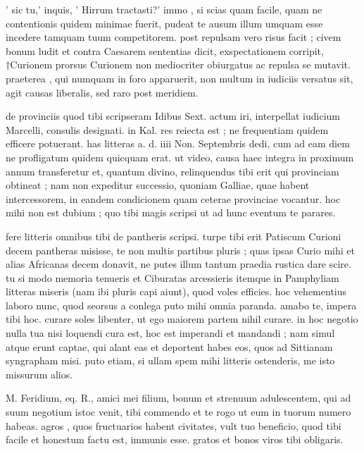


 ' sic tu,' inquis, ' Hirrum tractasti?' immo , si scias quam facile, quam ne contentionis quidem minimae fuerit, pudeat te ausum illum umquam esse incedere tamquam tuum competitorem. post repulsam vero risus facit ; civem bonum ludit et contra Caesarem sententias dicit, exspectationem corripit, †Curionem prorsus Curionem non mediocriter obiurgatus ac repulsa se mutavit. praeterea , qui numquam in foro apparuerit, non multum in iudiciis versatus sit, agit causas liberalis, sed raro post meridiem.

 de provinciis quod tibi scripseram Idibus Sext. actum iri, interpellat iudicium Marcelli, consulis designati. in Kal. res reiecta est ; ne frequentiam quidem efficere potuerant. has litteras a. d. iiii Non. Septembris dedi, cum ad eam diem ne profligatum quidem quicquam erat. ut video, causa haec integra in proximum annum transferetur et, quantum divino, relinquendus tibi erit qui provinciam obtineat ; nam non expeditur successio, quoniam Galliae, quae habent intercessorem, in eandem condicionem quam ceterae provinciae vocantur. hoc mihi non est dubium ; quo tibi magis scripsi ut ad hunc eventum te parares.

 fere litteris omnibus tibi de pantheris scripsi. turpe tibi erit Patiscum Curioni decem pantheras misisse, te non multis partibus pluris ; quas ipsas Curio mihi et alias Africanas decem donavit, ne putes illum tantum praedia rustica dare scire. tu si modo memoria tenueris et Ciburatas arcessieris itemque in Pamphyliam litteras miseris (nam ibi pluris capi aiunt), quod voles efficies. hoc vehementius laboro nunc, quod seorsus a conlega puto mihi omnia paranda. amabo te, impera tibi hoc. curare soles libenter, ut ego maiorem partem nihil curare. in hoc negotio nulla tua nisi loquendi cura est, hoc est imperandi et mandandi ; nam simul atque erunt captae, qui alant eas et deportent habes eos, quos ad Sittianam syngrapham misi. puto etiam, si ullam spem mihi litteris ostenderis, me isto missurum alios.

 M. Feridium, eq. R., amici mei filium, bonum et strenuum adulescentem, qui ad suum negotium istoc venit, tibi commendo et te rogo ut eum in tuorum numero habeas. agros , quos fructuarios habent civitates, vult tuo beneficio, quod tibi facile et honestum factu est, immunis esse. gratos et bonos viros tibi obligaris.

